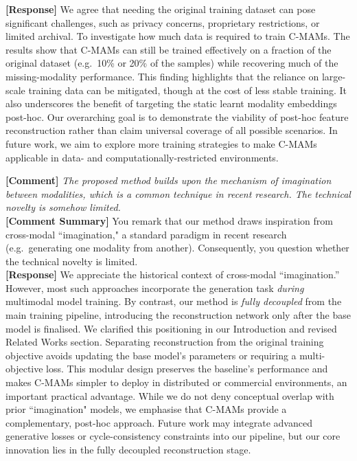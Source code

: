 \documentclass{article}
\begin{document}
\noindent\textbf{[Response]} We agree that needing the original training dataset can pose significant challenges, such as privacy concerns, proprietary restrictions, or limited archival. To investigate how much data is required to train C-MAMs. The results show that C-MAMs can still be trained effectively on a fraction of the original dataset (e.g.\ 10\% or 20\% of the samples) while recovering much of the missing-modality performance. This finding highlights that the reliance on large-scale training data can be mitigated, though at the cost of less stable training. It also underscores the benefit of targeting the static learnt modality embeddings post-hoc. Our overarching goal is to demonstrate the viability of post-hoc feature reconstruction rather than claim universal coverage of all possible scenarios. In future work, we aim to explore more training strategies to make C-MAMs applicable in data- and computationally-restricted environments.

\vspace{0.25cm}
\hline
\vspace{0.25cm}

\noindent\textbf{[Comment]} \textit{The proposed method builds upon the mechanism of imagination between modalities, which is a common technique in
recent research. The technical novelty is somehow limited.}
\\

\noindent\textbf{[Comment Summary]} You remark that our method draws inspiration from cross-modal ``imagination," a standard paradigm in recent research (e.g.\ generating one modality from another). Consequently, you question whether the technical novelty is limited.
\\

\noindent\textbf{[Response]} We appreciate the historical context of cross-modal ``imagination.” However, most such approaches incorporate the generation task \emph{during} multimodal model training. By contrast, our method is \emph{fully decoupled} from the main training pipeline, introducing the reconstruction network only after the base model is finalised. We clarified this positioning in our Introduction and revised Related Works section. Separating reconstruction from the original training objective avoids updating the base model's parameters or requiring a multi-objective loss. This modular design preserves the baseline's performance and makes C-MAMs simpler to deploy in distributed or commercial environments, an important practical advantage. While we do not deny conceptual overlap with prior ``imagination" models, we emphasise that C-MAMs provide a complementary, post-hoc approach. Future work may integrate advanced generative losses or cycle-consistency constraints into our pipeline, but our core innovation lies in the fully decoupled reconstruction stage.
\end{document}
